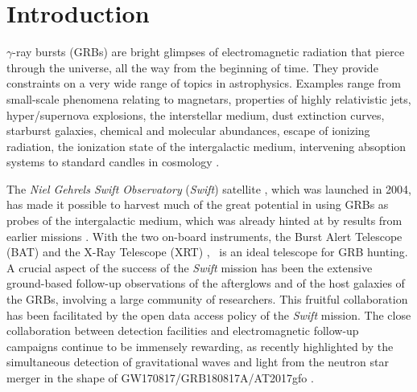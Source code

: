 \documentclass{aa}    %
\begin{document}
\maketitle

\section{Introduction}

$\gamma$-ray bursts (GRBs) are bright glimpses of electromagnetic radiation that
pierce through the universe, all the way from the beginning of time. They
provide constraints on a very wide range of topics in astrophysics. Examples
range from small-scale phenomena relating to magnetars, properties of highly
relativistic jets, hyper/supernova explosions, the interstellar medium, dust
extinction curves, starburst galaxies, chemical and molecular abundances, escape
of ionizing radiation, the ionization state of the intergalactic medium,
intervening absoption systems to standard candles in cosmology
\citep[e.g.,][]{Wijers1998, Savaglio2006, Ghirlanda2007, Molinari2007,
	Amati2008, Vergani2009, Prochaska2009, HjorthBloom2012, Rowlinson2017,
	Christensen2017}.

The \textit{Niel Gehrels Swift Observatory} ({\it Swift}) satellite
\citep{Gehrels2004, Gehrels2009}, which was launched in 2004, has made it
possible to harvest much of the great potential in using GRBs as probes of the
intergalactic medium, which was already hinted at by results from earlier
missions \citep[e.g.,][]{Paradijs2000, Ricker2004}. With the two on-board
instruments, the Burst Alert Telescope (BAT) \citep{Barthelmy2005} and the X-Ray
Telescope (XRT) \citep{Burrows2005}, \swift~is an ideal telescope for GRB
hunting. A crucial aspect of the success of the {\it Swift} mission has been the
extensive ground-based follow-up observations of the afterglows and of the host
galaxies of the GRBs, involving a large community of researchers. This fruitful
collaboration has been facilitated by the open data access policy of the
{\it Swift} mission. The close collaboration between detection facilities and
electromagnetic  follow-up campaigns continue to be immensely rewarding, as
recently highlighted by the simultaneous detection of gravitational waves and
light from the neutron star merger in the shape of GW170817/GRB180817A/AT2017gfo
\citep{LIGOScientificCollaboration2017a, LIGOScientificCollaboration2017}.
\end{document}
